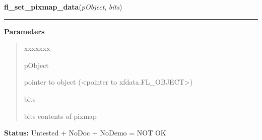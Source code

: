     \label{xformslib:library:fl_set_pixmap_data}

    \vspace{0.5ex}

\hspace{.8\funcindent}\begin{boxedminipage}{\funcwidth}

    \raggedright \textbf{fl\_set\_pixmap\_data}(\textit{pObject}, \textit{bits})

    \vspace{-1.5ex}

    \rule{\textwidth}{0.5\fboxrule}
\setlength{\parskip}{2ex}
\setlength{\parskip}{1ex}
      \textbf{Parameters}
      \vspace{-1ex}

      \begin{quote}
        \begin{Ventry}{xxxxxxx}

          \item[pObject]

          pointer to object ({\textless}pointer to 
          xfdata.FL\_OBJECT{\textgreater})

          \item[bits]

          bits contents of pixmap

        \end{Ventry}

      \end{quote}

\textbf{Status:} Untested + NoDoc + NoDemo = NOT OK



    \end{boxedminipage}

    \label{xformslib:library:fl_set_pixmap_file}

    \vspace{0.5ex}

